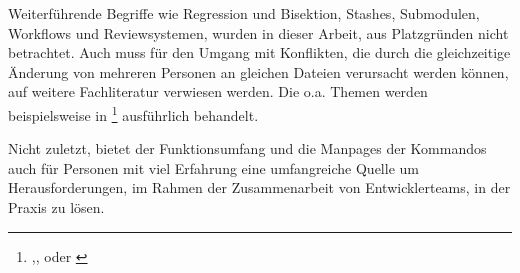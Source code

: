 Weiterführende Begriffe wie Regression und Bisektion, Stashes, Submodulen,
Workflows und Reviewsystemen, wurden in dieser Arbeit, aus Platzgründen nicht
betrachtet. Auch muss für den Umgang mit Konflikten, die durch die
gleichzeitige Änderung von mehreren Personen an gleichen Dateien verursacht
werden können, auf weitere Fachliteratur verwiesen werden. Die o.a. Themen
werden beispielsweise in \footnote{\cite{gitosp},\cite{progit},\cite{gitwf}
oder \cite{cd}} ausführlich behandelt.

Nicht zuletzt, bietet der Funktionsumfang und die Manpages der Kommandos auch
für Personen mit viel Erfahrung eine umfangreiche Quelle um Herausforderungen,
im Rahmen der Zusammenarbeit von Entwicklerteams, in der Praxis zu lösen.

